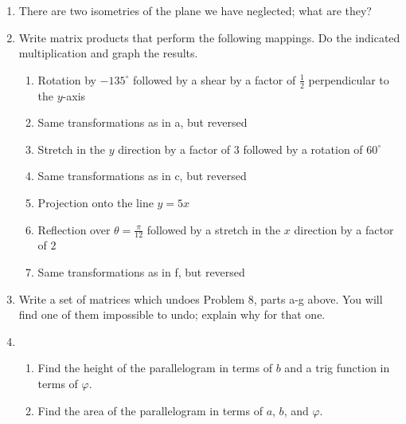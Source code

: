 \documentclass[../gatm.tex]{subfiles}
\begin{document}
\begin{enumerate}
\item There are two isometries of the plane we have neglected; what are they?
\item Write matrix products that perform the following mappings. Do the indicated multiplication and graph the results.
\begin{enumerate}
\item Rotation by $-135^\circ$ followed by a shear by a factor of $\frac{1}{2}$ perpendicular to the $y$-axis
\item Same transformations as in a, but reversed
\item Stretch in the $y$ direction by a factor of $3$ followed by a rotation of $60^\circ$
\item Same transformations as in c, but reversed
\item Projection onto the line $y=5x$
\item Reflection over $\theta=\frac{\pi}{12}$ followed by a stretch in the $x$ direction by a factor of $2$
\item Same transformations as in f, but reversed
\end{enumerate}
\item Write a set of matrices which undoes Problem 8, parts a-g above. You will find one of them impossible to undo; explain why for that one.
\item \begin{enumerate}
\item Find the height of the parallelogram in terms of $b$ and a trig function in terms of $\varphi$.
\item Find the area of the parallelogram in terms of $a$, $b$, and $\varphi$.
\end{enumerate}
\end{enumerate}
\end{document}
